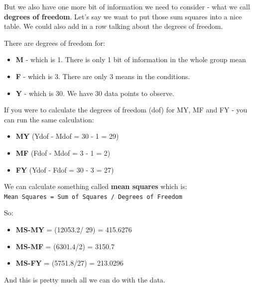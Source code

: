 \documentclass[
]{book}
\newenvironment{Shaded}{\begin{snugshade}}{\end{snugshade}}
\newcommand{\CommentTok}[1]{\textcolor[rgb]{0.56,0.35,0.01}{\textit{#1}}}
\newcommand{\DataTypeTok}[1]{\textcolor[rgb]{0.13,0.29,0.53}{#1}}
\newcommand{\DecValTok}[1]{\textcolor[rgb]{0.00,0.00,0.81}{#1}}
\newcommand{\KeywordTok}[1]{\textcolor[rgb]{0.13,0.29,0.53}{\textbf{#1}}}
\newcommand{\NormalTok}[1]{#1}
\newcommand{\OperatorTok}[1]{\textcolor[rgb]{0.81,0.36,0.00}{\textbf{#1}}}
\newcommand{\StringTok}[1]{\textcolor[rgb]{0.31,0.60,0.02}{#1}}
\begin{document}
But we also have one more bit of information we need to consider - what we call \textbf{degrees of freedom}. Let's say we want to put those sum squares into a nice table. We could also add in a row talking about the degrees of freedom.

There are degrees of freedom for:

\begin{itemize}
\item
  \textbf{M} - which is 1. There is only 1 bit of information in the whole group mean
\item
  \textbf{F} - which is 3. There are only 3 means in the conditions.
\item
  \textbf{Y} - which is 30. We have 30 data points to observe.
\end{itemize}

If you were to calculate the degrees of freedom (dof) for MY, MF and FY - you can run the same calculation:

\begin{itemize}
\item
  \textbf{MY} (Ydof - Mdof = 30 - 1 = 29)
\item
  \textbf{MF} (Fdof - Mdof = 3 - 1 = 2)
\item
  \textbf{FY} (Ydof - Fdof = 30 - 3 = 27)
\end{itemize}

We can calculate something called \textbf{mean squares} which is:
\texttt{Mean\ Squares\ =\ Sum\ of\ Squares\ /\ Degrees\ of\ Freedom}

So:

\begin{itemize}
\item
  \textbf{MS-MY} = (12053.2/ 29) = 415.6276
\item
  \textbf{MS-MF} = (6301.4/2) = 3150.7
\item
  \textbf{MS-FY} = (5751.8/27) = 213.0296
\end{itemize}

And this is pretty much all we can do with the data.

\begin{Shaded}
\end{Shaded}
\end{document}
